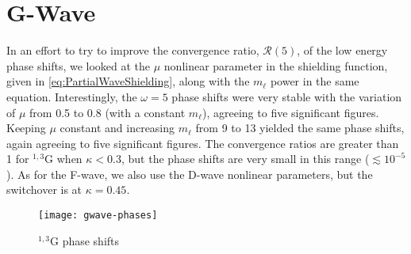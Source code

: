 \documentclass[Dissertation.tex]{subfiles}
\begin{document}
\section{G-Wave}
\label{sec:GWave}

In an effort to try to improve the convergence ratio, $\mathcal{R}(5)$,
of the low energy phase shifts, we
looked at the $\mu$ nonlinear parameter in the shielding function, given
in \cref{eq:PartialWaveShielding}, along with the $m_\ell$ power in the same
equation. Interestingly, the $\omega = 5$ phase shifts were very stable with
the variation of $\mu$ from 0.5 to 0.8 (with a constant $m_\ell$), agreeing to
five significant figures. Keeping $\mu$ constant and increasing $m_\ell$ from
9 to 13 yielded the same phase shifts, again agreeing to five significant
figures. The convergence ratios are greater than 1 for $^{1,3}$G when
$\kappa < 0.3$, but the phase shifts are very small in this range
($\lesssim 10^{-5}$). As for the F-wave, we also use the D-wave nonlinear
parameters, but the switchover is at $\kappa = 0.45$.


\begin{figure}
	\centering
	\texttt{[image: gwave-phases]}
	\caption{$^{1,3}$G phase shifts}
	\label{fig:GWavePhase}
\end{figure}

\end{document}
